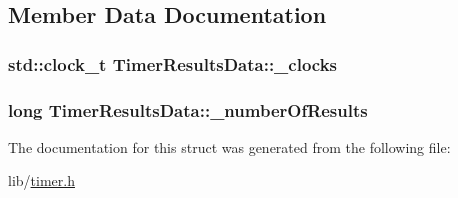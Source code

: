 \subsection{Member Data Documentation}
\hypertarget{struct_timer_results_data_aeba843a4f680eab7aa6c039cd436a594}{
\subsubsection[{\-\_\-clocks}]{\setlength{\rightskip}{0pt plus 5cm}std\-::clock\-\_\-t Timer\-Results\-Data\-::\-\_\-clocks}}\label{struct_timer_results_data_aeba843a4f680eab7aa6c039cd436a594}
\hypertarget{struct_timer_results_data_a2b3c1208d5f8f7fabb27e36122b0ed04}{
\subsubsection[{\-\_\-number\-Of\-Results}]{\setlength{\rightskip}{0pt plus 5cm}long Timer\-Results\-Data\-::\-\_\-number\-Of\-Results}}\label{struct_timer_results_data_a2b3c1208d5f8f7fabb27e36122b0ed04}


The documentation for this struct was generated from the following file\-:\begin{DoxyCompactItemize}
\item 
lib/\hyperlink{timer_8h}{timer.\-h}\end{DoxyCompactItemize}
